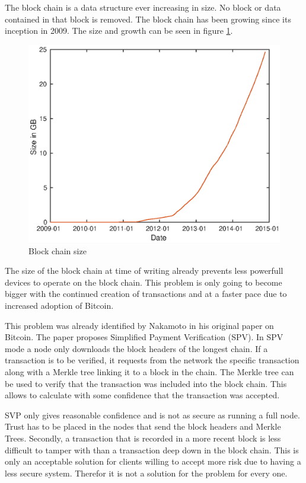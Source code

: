 The block chain is a data structure ever increasing in size.
No block or data contained in that block is removed.
The block chain has been growing since its inception in 2009.
The size and growth can be seen in figure \ref{fig:bc-size}.

\begin{figure}[H]
        \centerline{\includegraphics[scale=0.6]{problemDescription/figs/bcs/blockchainsize.eps}}
        \caption{Block chain size\cite{Blockchain.info-bcs}}
	\label{fig:bc-size}
\end{figure}

The size of the block chain at time of writing already prevents less powerfull devices
to operate on the block chain.
This problem is only going to become bigger with the continued creation of transactions
and at a faster pace due to increased adoption of Bitcoin.

This problem was already identified by Nakamoto in his original paper on Bitcoin.
The paper proposes Simplified Payment Verification (SPV).
In SPV mode a node only downloads the block headers of the longest chain.
If a transaction is to be verified, it requests from the network the specific transaction
along with a Merkle tree linking it to a block in the chain.
The Merkle tree can be used to verify that the transaction was included into the block chain.
This allows to calculate with some confidence that the transaction was accepted.

SVP only gives reasonable confidence and is not as secure as running a full node.
Trust has to be placed in the nodes that send the block headers and Merkle Trees.
Secondly, a transaction that is recorded in a more recent block is less difficult to tamper with
than a transaction deep down in the block chain.
This is only an acceptable solution for clients willing to accept more risk due to having a less secure system.
Therefor it is not a solution for the problem for every one.

